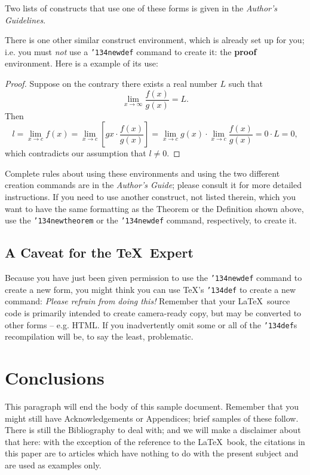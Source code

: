 \documentclass{sigkddExp}
\begin{document}
Two lists of constructs that use one of these
forms is given in the
\textit{Author's  Guidelines}.
 
There is one other similar construct environment, which is
already set up
for you; i.e. you must \textit{not} use
a \texttt{{\char'134}newdef} command to
create it: the \textbf{proof} environment.  Here
is a example of its use:
\begin{proof}
Suppose on the contrary there exists a real number $L$ such that
\begin{displaymath}
\lim_{x\rightarrow\infty} \frac{f(x)}{g(x)} = L.
\end{displaymath}
Then
\begin{displaymath}
l=\lim_{x\rightarrow c} f(x)
= \lim_{x\rightarrow c}
\left[ g{x} \cdot \frac{f(x)}{g(x)} \right ]
= \lim_{x\rightarrow c} g(x) \cdot \lim_{x\rightarrow c}
\frac{f(x)}{g(x)} = 0\cdot L = 0,
\end{displaymath}
which contradicts our assumption that $l\neq 0$.
\end{proof}

Complete rules about using these environments and using the
two different creation commands are in the
\textit{Author's Guide}; please consult it for more
detailed instructions.  If you need to use another construct,
not listed therein, which you want to have the same
formatting as the Theorem
or the Definition\cite{salas:calculus} shown above,
use the \texttt{{\char'134}newtheorem} or the
\texttt{{\char'134}newdef} command,
respectively, to create it.

\subsection*{A Caveat for the \TeX\ Expert}
Because you have just been given permission to
use the \texttt{{\char'134}newdef} command to create a
new form, you might think you can
use \TeX's \texttt{{\char'134}def} to create a
new command: \textit{Please refrain from doing this!}
Remember that your \LaTeX\ source code is primarily intended
to create camera-ready copy, but may be converted
to other forms -- e.g. HTML. If you inadvertently omit
some or all of the \texttt{{\char'134}def}s recompilation will
be, to say the least, problematic.

\section{Conclusions}
This paragraph will end the body of this sample document.
Remember that you might still have Acknowledgements or
Appendices; brief samples of these
follow.  There is still the Bibliography to deal with; and
we will make a disclaimer about that here: with the exception
of the reference to the \LaTeX\ book, the citations in
this paper are to articles which have nothing to
do with the present subject and are used as
examples only.
\end{document}
